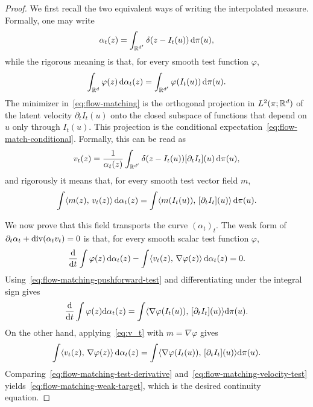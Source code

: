 \begin{proof}
	We first recall the two equivalent ways of writing the interpolated measure. Formally, one may write
	\[
		\alpha_t(z)=\int_{\mathbb{R}^{d'}}\delta(z-I_t(u))\,\mathrm{d}\pi(u),
	\]
	while the rigorous meaning is that, for every smooth test function $\varphi$,
	\begin{equation}\label{eq:flow-matching-pushforward-test}
\index{push-forward}%
		\int_{\RR^d}\varphi(z)\,\d\alpha_t(z)
		=
		\int_{\RR^{d'}}\varphi(I_t(u))\,\d\pi(u).
	\end{equation}
	The minimizer in~\eqref{eq:flow-matching} is the orthogonal projection in $L^2(\pi;\mathbb{R}^d)$ of the latent velocity $\partial_t I_t(u)$ onto the closed subspace of functions that depend on $u$ only through $I_t(u)$. This projection is the conditional expectation~\eqref{eq:flow-match-conditional}. Formally, this can be read as
	\[
		v_t(z)=\frac{1}{\alpha_t(z)}
		\int_{\mathbb{R}^{d'}}\delta(z-I_t(u))[\partial_t I_t](u)\,\mathrm{d}\pi(u),
	\]
	and rigorously it means that, for every smooth test vector field $m$,
	\begin{equation}\label{eq:v_t}
		\int \langle m(z),\,v_t(z)\rangle \, \mathrm{d}\alpha_t(z)
		=
		\int \langle m(I_t(u)),\,[\partial_t I_t](u)\rangle \, \mathrm{d}\pi(u).
	\end{equation}

	We now prove that this field transports the curve $(\alpha_t)_t$. The weak form of
	$\partial_t\alpha_t+\operatorname{div}(\alpha_t v_t)=0$ is that, for every smooth scalar test function $\varphi$,
	\begin{equation}\label{eq:flow-matching-weak-target}
		\frac{\mathrm{d}}{\mathrm{d} t}\int\varphi(z)\,\mathrm{d}\alpha_t(z)
		-
		\int\langle v_t(z),\,\nabla\varphi(z)\rangle\,\mathrm{d}\alpha_t(z)
		=0.
	\end{equation}
	Using~\eqref{eq:flow-matching-pushforward-test} and differentiating under the integral sign gives
	\begin{equation}\label{eq:flow-matching-test-derivative}
		\frac{\mathrm{d}}{\mathrm{d} t}\int \varphi(z)\mathrm{d}\alpha_t(z)
		=
		\int \langle \nabla\varphi(I_t(u)),\,[\partial_t I_t](u)\rangle\mathrm{d}\pi(u).
	\end{equation}
	On the other hand, applying~\eqref{eq:v_t} with $m=\nabla\varphi$ gives
	\begin{equation}\label{eq:flow-matching-velocity-test}
		\int\langle v_t(z),\,\nabla\varphi(z)\rangle\,\mathrm{d}\alpha_t(z)
		=
		\int \langle \nabla\varphi(I_t(u)),\,[\partial_t I_t](u)\rangle\mathrm{d}\pi(u).
	\end{equation}
	Comparing~\eqref{eq:flow-matching-test-derivative} and~\eqref{eq:flow-matching-velocity-test} yields~\eqref{eq:flow-matching-weak-target}, which is the desired continuity equation.
\end{proof}

